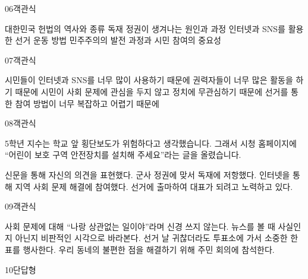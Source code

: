 \documentclass[fs95,seriesFre]{korfarm-base}
\begin{document}
\begin{kfQBlock}{06}{객관식}
\begin{kfChoices}
\kfChoice 대한민국 헌법의 역사와 종류
\kfChoice 독재 정권이 생겨나는 원인과 과정
\kfChoice 인터넷과 SNS를 활용한 선거 운동 방법
\kfChoice 민주주의의 발전 과정과 시민 참여의 중요성
\end{kfChoices}
\end{kfQBlock}
\begin{kfQBlock}{07}{객관식}
\begin{kfChoices}
\kfChoice 시민들이 인터넷과 SNS를 너무 많이 사용하기 때문에
\kfChoice 권력자들이 너무 많은 활동을 하기 때문에
\kfChoice 시민이 사회 문제에 관심을 두지 않고 정치에 무관심하기 때문에
\kfChoice 선거를 통한 참여 방법이 너무 복잡하고 어렵기 때문에
\end{kfChoices}
\end{kfQBlock}
\begin{kfQBlock}{08}{객관식}
\begin{kfEvidence}5학년 지수는 학교 앞 횡단보도가 위험하다고 생각했습니다. 그래서 시청 홈페이지에 “어린이 보호 구역 안전장치를 설치해 주세요”라는 글을 올렸습니다.\end{kfEvidence}
\begin{kfChoices}
\kfChoice 신문을 통해 자신의 의견을 표현했다.
\kfChoice 군사 정권에 맞서 독재에 저항했다.
\kfChoice 인터넷을 통해 지역 사회 문제 해결에 참여했다.
\kfChoice 선거에 출마하여 대표가 되려고 노력하고 있다.
\end{kfChoices}
\end{kfQBlock}
\begin{kfQBlock}{09}{객관식}
\begin{kfChoices}
\kfChoice 사회 문제에 대해 “나랑 상관없는 일이야”라며 신경 쓰지 않는다.
\kfChoice 뉴스를 볼 때 사실인지 아닌지 비판적인 시각으로 바라본다.
\kfChoice 선거 날 귀찮더라도 투표소에 가서 소중한 한 표를 행사한다.
\kfChoice 우리 동네의 불편한 점을 해결하기 위해 주민 회의에 참석한다.
\end{kfChoices}
\end{kfQBlock}
\begin{kfQBlock}{10}{단답형}
\end{kfQBlock}
\end{document}
